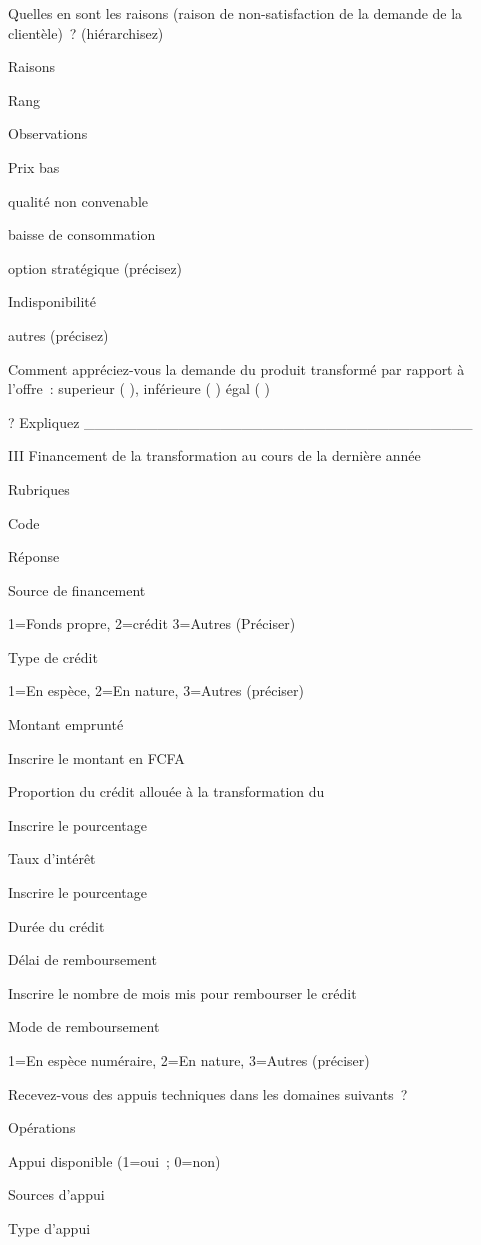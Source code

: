 \documentclass[12pt,oneside]{report}
\begin{document}
Quelles en sont les raisons (raison de non-satisfaction de la demande de la clientèle) ? (hiérarchisez)

Raisons

Rang

Observations

Prix bas

qualité non convenable

baisse de consommation

option stratégique (précisez)

Indisponibilité

autres (précisez)

Comment appréciez-vous la demande du produit transformé par rapport à l'offre :  superieur  ( ),  inférieure  ( )  égal ( )

? Expliquez \_\_\_\_\_\_\_\_\_\_\_\_\_\_\_\_\_\_\_\_\_\_\_\_\_\_\_\_\_\_\_\_\_\_\_\_\_

III Financement de la transformation au cours de la dernière année

Rubriques

Code

Réponse

Source de financement

1=Fonds propre, 2=crédit  3=Autres (Préciser)

Type de crédit

1=En espèce, 2=En nature, 3=Autres (préciser)

Montant emprunté

Inscrire le montant en FCFA

Proportion du crédit allouée à la transformation du

Inscrire le pourcentage

Taux d’intérêt

Inscrire le pourcentage

Durée du crédit

Délai de remboursement

Inscrire le nombre de mois mis pour rembourser le crédit

Mode de remboursement

1=En espèce numéraire, 2=En nature, 3=Autres (préciser)

Recevez-vous des appuis techniques dans les domaines suivants ?

Opérations

Appui disponible (1=oui ; 0=non)

Sources d'appui

Type d'appui
\end{document}
